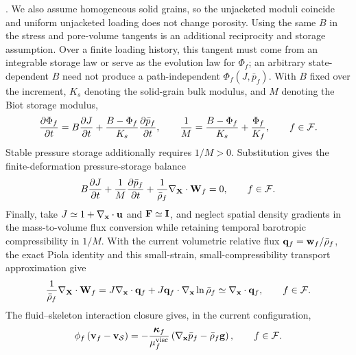 \cite{coussy2004poromechanics,detournay1993fundamentals}.  We also assume
homogeneous solid grains, so the unjacketed moduli coincide and uniform
unjacketed loading does not change porosity.  Using the same \(B\) in the stress and pore-volume
tangents is an additional reciprocity and storage assumption.  Over a finite
loading history, this tangent must come from an integrable storage law or serve
as the evolution law for \(\Phi_f\); an arbitrary state-dependent \(B\) need
not produce a path-independent \(\Phi_f(J,\bar p_f)\).  With \(B\) fixed over
the increment, \(K_s\) denoting the solid-grain bulk modulus, and \(M\)
denoting the Biot storage modulus,
%
\begin{equation}
	\frac{\partial\Phi_f}{\partial t}
	=
	B\frac{\partial J}{\partial t}
	+\frac{B-\Phi_f}{K_s}
	\frac{\partial\bar p_f}{\partial t},
	\qquad
	\frac{1}{M}
	=
	\frac{B-\Phi_f}{K_s}
	+\frac{\Phi_f}{K_f},
	\qquad
	f\in\mathcal{F} .
	\label{eq:biot_limit_porosity_tangent_storage}
\end{equation}
%
Stable pressure storage additionally requires \(1/M>0\).
Substitution gives the finite-deformation pressure-storage balance
%
\begin{equation}
	B\frac{\partial J}{\partial t}
	+\frac{1}{M}\frac{\partial\bar p_f}{\partial t}
	+\frac{1}{\bar\rho_f}\nabla_{\mathbf{X}}\cdot\mathbf{W}_f
	=0,
	\qquad
	f\in\mathcal{F} .
	\label{eq:biot_limit_pressure_storage_balance}
\end{equation}
%
Finally, take
\(J\simeq 1+\nabla_{\mathbf{x}}\cdot\mathbf{u}\) and
\(\mathbf{F}\simeq\mathbf{I}\), and neglect spatial density gradients in the
mass-to-volume flux conversion while retaining temporal barotropic
compressibility in \(1/M\).  With the current volumetric relative flux
\(\mathbf{q}_f=\mathbf{w}_f/\bar\rho_f\), the exact Piola identity and this
small-strain, small-compressibility transport approximation give
%
\begin{equation}
	\frac{1}{\bar\rho_f}
	\nabla_{\mathbf{X}}\cdot\mathbf{W}_f
	=
	J\nabla_{\mathbf{x}}\cdot\mathbf{q}_f
	+
	J\mathbf{q}_f\cdot
	\nabla_{\mathbf{x}}\ln\bar\rho_f
	\simeq
	\nabla_{\mathbf{x}}\cdot\mathbf{q}_f,
	\qquad
	f\in\mathcal{F} .
	\label{eq:biot_limit_mass_to_volume_flux_approximation}
\end{equation}
%
The fluid--skeleton interaction closure gives, in the current configuration,
%
\begin{equation}
	\phi_f\left(\mathbf{v}_f-\mathbf{v}_{\mathcal{S}}\right)
	=
	-\frac{\boldsymbol{\kappa}_f}{\mu_f^{\mathrm{visc}}}
	\left(
		\nabla_{\mathbf{x}}\bar p_f
		-\bar\rho_f\mathbf{g}
	\right),
	\qquad
	f\in\mathcal{F} .
	\label{eq:biot_limit_darcy_law}
\end{equation}
